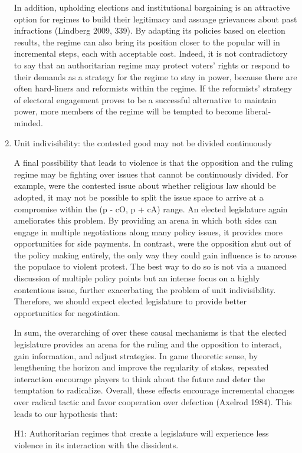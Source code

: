 \begin{enumerate}
In addition, upholding elections and institutional bargaining is an attractive option for regimes to build their legitimacy and assuage grievances about past infractions (Lindberg 2009, 339). By adapting its policies based on election results, the regime can also bring its position closer to the popular will in incremental steps, each with acceptable cost. Indeed, it is not contradictory to say that an authoritarian regime may protect voters’ rights or respond to their demands as a strategy for the regime to stay in power, because there are often hard-liners and reformists within the regime. If the reformists’ strategy of electoral engagement proves to be a successful alternative to maintain power, more members of the regime will be tempted to become liberal-minded.

\item Unit indivisibility: the contested good may not be divided continuously

A final possibility that leads to violence is that the opposition and the ruling regime may be fighting over issues that cannot be continuously divided. For example, were the contested issue about whether religious law should be adopted, it may not be possible to split the issue space to arrive at a compromise within the (p - cO, p + cA) range. An elected legislature again ameliorates this problem. By providing an arena in which both sides can engage in multiple negotiations along many policy issues, it provides more opportunities for side payments. In contrast, were the opposition shut out of the policy making entirely, the only way they could gain influence is to arouse the populace to violent protest. The best way to do so is not via a nuanced discussion of multiple policy points but an intense focus on a highly contentious issue, further exacerbating the problem of unit indivisibility. Therefore, we should expect elected legislature to provide better opportunities for negotiation.

In sum, the overarching of over these causal mechanisms is that the elected legislature provides an arena for the ruling and the opposition to interact, gain information, and adjust strategies. In game theoretic sense, by lengthening the horizon and improve the regularity of stakes, repeated interaction encourage players to think about the future and deter the temptation to radicalize. Overall, these effects encourage incremental changes over radical tactic and favor cooperation over defection (Axelrod 1984). This leads to our hypothesis that:

H1: Authoritarian regimes that create a legislature will experience less violence in its interaction with the dissidents.
\end{enumerate}

